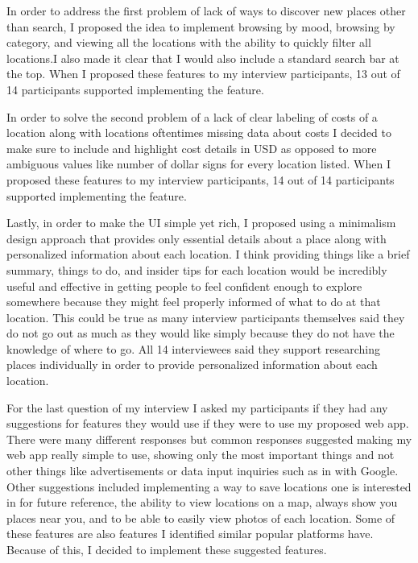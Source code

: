 \documentclass[12pt,twocolumn]{article}
\begin{document}
In order to address the first problem of lack of ways to discover new places other than search, I proposed the idea to implement browsing by mood, browsing by category, and viewing all the locations with the ability to quickly filter all locations.I also made it clear that I would also include a standard search bar at the top.  When I proposed these features to my interview participants, 13 out of 14 participants supported implementing the feature. 

In order to solve the second problem of  a lack of clear labeling of costs of a location along with locations oftentimes missing data about costs I decided to make sure to include and highlight cost details in  USD  as opposed to more ambiguous values like number of dollar signs for every location listed.  When I proposed these features to my interview participants, 14 out of 14 participants supported implementing the feature. 

Lastly, in order to make the UI simple yet rich, I proposed using a minimalism design approach that provides only  essential details about a place along with personalized information about each location. I think providing things  like a brief summary, things to do, and insider tips for each location would be incredibly useful and effective in getting people to feel confident enough to explore somewhere because they might feel properly informed of what to do at that location. This could be true as many interview participants themselves said they do not go out as much as they would like simply because they do not have the knowledge of where to go.  All 14 interviewees said they  support researching places individually in order to provide personalized information about each location. 

For the last question of my interview I asked my participants if they had any suggestions for features they would use if they were to use my proposed web app. There were many different responses but common responses suggested making my web app really simple to use, showing only the most important things and not other things like advertisements or data input inquiries such as in with Google. Other suggestions included implementing a way to save locations one is interested in for future reference, the ability to view locations on a map, always show you places near you, and to be able to easily view photos of each location. Some of these features are also features I identified similar popular platforms have. Because of this, I decided to implement these suggested features. 
 
\end{document}

